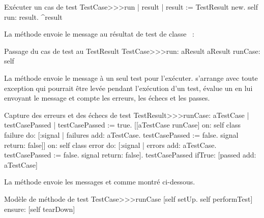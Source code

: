 \documentclass[a4paper,10pt,twoside]{book}
\begin{document}
\begin{method}[tastecaserun]{Exécuter un cas de test}
TestCase>>>run
	| result |
	result := TestResult new.
	self run: result.
	^result
\end{method}


La méthode  envoie le message  au résultat de test de classe ~:

\begin{method}[testcaserun:]{Passage du cas de test au TestResult}
TestCase>>>run: aResult
	aResult runCase: self
\end{method}
La méthode  envoie le message  à un seul test pour l'exécuter.
 s'arrange avec toute exception qui pourrait être levée pendant l'exécution d'un test, évalue un  en lui envoyant le message  et compte les erreurs, les échecs et les passes.

\begin{method}[testresultruncase]{Capture des erreurs et des échecs de test}
TestResult>>>runCase: aTestCase
	| testCasePassed |
	testCasePassed := true.
	[[aTestCase runCase] 
			on: self class failure
			do: 
				[:signal | 
				failures add: aTestCase.
				testCasePassed := false.
				signal return: false]]
					on: self class error
					do:
						[:signal |
						errors add: aTestCase.
						testCasePassed := false.
						signal return: false].
	testCasePassed ifTrue: [passed add: aTestCase]
\end{method}

La méthode  envoie les messages
 et  comme montré
ci-dessous.
\begin{method}[testcaseruncase]{Modèle de méthode de test}
TestCase>>>runCase
	[self setUp.
	self performTest] ensure: [self tearDown]
\end{method} %


\end{document}
